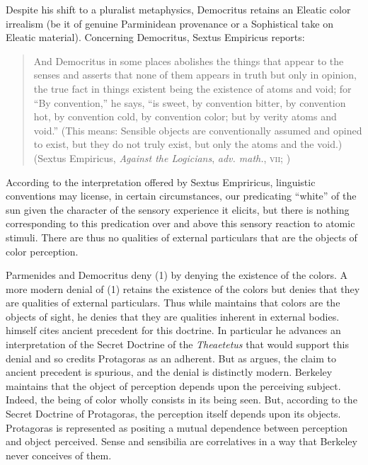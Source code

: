 Despite his shift to a pluralist metaphysics, Democritus retains an Eleatic color irrealism (be it of genuine Parminidean provenance or a Sophistical take on Eleatic material). Concerning Democritus, Sextus Empiricus reports:
\begin{quote}
	And Democritus in some places abolishes the things that appear to the senses and asserts that none of them appears in truth but only in opinion, the true fact in things existent being the existence of atoms and void; for ``By convention,'' he says, ``is sweet, by convention bitter, by convention hot, by convention cold, by convention color; but by verity atoms and void.'' (This means: Sensible objects are conventionally assumed and opined to exist, but they do not truly exist, but only the atoms and the void.) (Sextus Empiricus, \emph{Against the Logicians}, \emph{adv. math.}, \textsc{vii}; \citealt[135--136]{Bury:1997uq}) 
\end{quote}
According to the interpretation offered by Sextus Empriricus, linguistic conventions may license, in certain circumstances, our predicating ``white'' of the sun given the character of the sensory experience it elicits, but there is nothing corresponding to this predication over and above this sensory reaction to atomic stimuli. There are thus no qualities of external particulars that are the objects of color perception. 

Parmenides and Democritus deny (1) by denying the existence of the colors. A more modern denial of (1) retains the existence of the colors but denies that they are qualities of external particulars. Thus while \citet{Berkeley:1734fk} maintains that colors are the objects of sight, he denies that they are qualities inherent in external bodies. \citet{Berkeley:1744rm} himself cites ancient precedent for this doctrine. In particular he advances an interpretation of the Secret Doctrine of the \emph{Theaetetus} that would support this denial and so credits Protagoras as an adherent. But as \citet{Burnyeat:1982mz} argues, the claim to ancient precedent is spurious, and the denial is distinctly modern. Berkeley maintains that the object of perception depends upon the perceiving subject. Indeed, the being of color wholly consists in its being seen. But, according to the Secret Doctrine of Protagoras, the perception itself depends upon its objects. Protagoras is represented as positing a mutual dependence between perception and object perceived. Sense and sensibilia are correlatives in a way that Berkeley never conceives of them.

